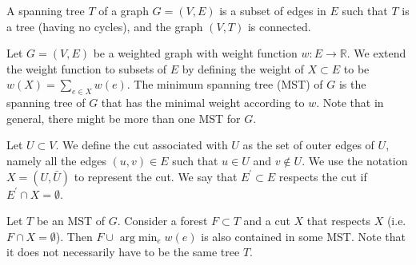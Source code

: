 \begin{definition}
  A spanning tree $T$ of a graph $G=(V,E)$ is a subset of edges in $E$ such that $T$ is a tree (having no cycles), and the graph $(V,T)$ is connected.   
\end{definition}

\begin{problem}[MST] Let $G = (V,E)$ be a weighted graph with weight function $w : E \rightarrow \mathbb{R}$. We extend the weight function to subsets of $E$ by defining the weight of $X\subset E$ to be $w(X)= \sum_{e \in X}w(e)$. The minimum spanning tree (MST) of $G$ is the spanning tree of $G$ that has the minimal weight according to $w$. Note that in general, there might be more than one MST for $G$. 
\end{problem}

\begin{definition}
  \label{def:cut}
  Let $U \subset V$. We define the cut associated with $U$ as the set of outer edges of $U$, namely all the edges $(u,v)\in E$ such that $u\in U$ and $v \notin U$. We use the notation $X = (U, \bar{U})$ to represent the cut. We say that $E^{\prime} \subset E$ respects the cut if $E^{\prime} \cap X = \emptyset$.
\end{definition} 

\begin{lemma} 
  \label{lemma:cut}
  Let $T$ be an MST of $G$. Consider a forest $F \subset T$ and a cut $X$ that respects $X$ (i.e. $F \cap X = \emptyset$). Then $F \cup \text{ arg}\min_{e} w(e)$ is also contained in some MST. Note that it does not necessarily have to be the same tree $T$. 
\end{lemma}

